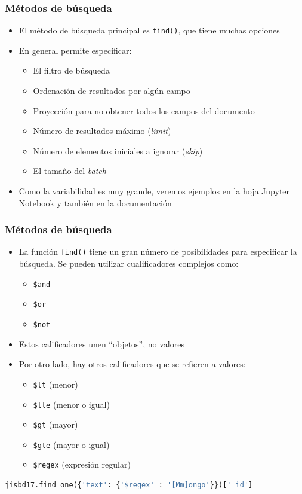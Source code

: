 \documentclass[14pt]{beamer}
\begin{document}
\begin{frame}
  \frametitle{Métodos de búsqueda}
  \begin{itemize}
  \item El método de búsqueda principal es {\tt find()}, que tiene muchas
    opciones
  \item En general permite especificar:

    \begin{itemize}
    \item El filtro de búsqueda
    \item Ordenación de resultados por algún campo
    \item Proyección para no obtener todos los campos del documento
    \item Número de resultados máximo ({\em limit\/})
    \item Número de elementos iniciales a ignorar ({\em skip\/})
    \item El tamaño del {\em batch}
    \end{itemize}

  \item Como la variabilidad es muy grande, veremos ejemplos en la hoja
    Jupyter Notebook y también en la documentación

  \end{itemize}
\end{frame}

\begin{frame}
  \frametitle{Métodos de búsqueda}
  \begin{itemize}
  \item La función {\tt find()} tiene un gran número de posibilidades para
    especificar la búsqueda. Se pueden utilizar cualificadores complejos
    como:
    \begin{itemize}
    \item \verb|$and|
    \item \verb|$or|
    \item \verb|$not|
    \end{itemize}

  \item Estos calificadores unen ``objetos'', no valores
\framebreak
  \item Por otro lado, hay
    otros calificadores que se refieren a valores:
\begin{itemize}
\item \verb|$lt| (menor)
\item \verb|$lte| (menor o igual)
\item \verb|$gt| (mayor)
\item \verb|$gte| (mayor o igual)
\item \verb|$regex| (expresión regular)
\end{itemize}
  \end{itemize}
\begin{lstlisting}[language=Python]
jisbd17.find_one({'text': {'$regex' : '[Mm]ongo'}})['_id']
\end{lstlisting}
\end{frame}
\end{document}
